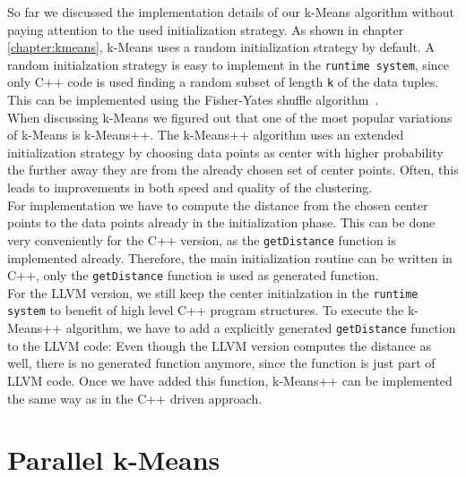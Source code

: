 So far we discussed the implementation details of our k-Means algorithm without paying attention to the used initialization strategy. As shown in chapter \ref{chapter:kmeans}, k-Means uses a random initialization strategy by default. A random initialzation strategy is easy to implement in the \texttt{runtime system}, since only C++ code is used finding a random subset of length \texttt{k} of the data tuples. This can be implemented using the Fisher-Yates shuffle algorithm~\parencite{fisheryates}. 
\\
When discussing k-Means we figured out that one of the most popular variations of k-Means is k-Means++. The k-Means++ algorithm uses an extended initialization strategy by choosing data points as center with higher probability the further away they are from the already chosen set of center points. Often, this leads to improvements in both speed and quality of the clustering.
\\
For implementation we have to compute the distance from the chosen center points to the data points already in the initialization phase. This can be done very conveniently for the C++ version, as the \texttt{getDistance} function is implemented already. Therefore, the main initialization routine can be written in C++, only the \texttt{getDistance} function is used as generated function.
\\
For the LLVM version, we still keep the center initialzation in the \texttt{runtime system} to benefit of high level C++ program structures. To execute the k-Means++ algorithm, we have to add a explicitly generated \texttt{getDistance} function to the LLVM code: Even though the LLVM version computes the distance as well, there is no generated function anymore, since the function is just part of LLVM code. Once we have added this function, k-Means++ can be implemented the same way as in the C++ driven approach.

\section{Parallel k-Means}

